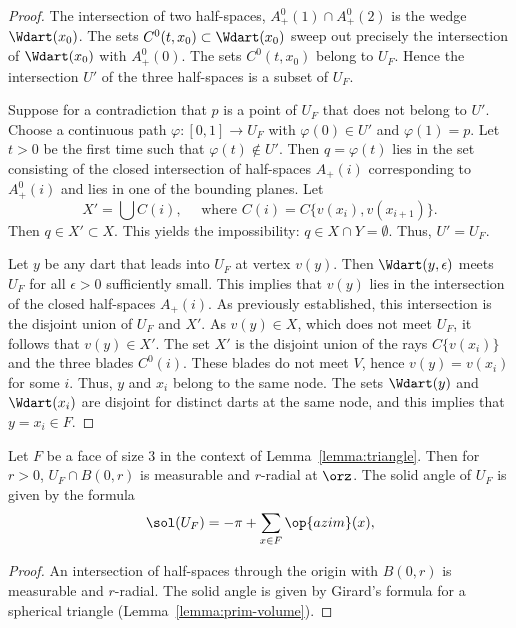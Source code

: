 \begin{proof} The intersection of two half-spaces, $A^0_+(1)\cap A^0_+(2)$ is
the wedge $\Wdart(x_0)$.   The sets $C^0(t,x_0)\subset\Wdart(x_0)$ sweep out precisely
the intersection of $\Wdart(x_0)$ with $A^0_+(0)$.  The sets $C^0(t,x_0)$ belong to
$U_F$.  Hence the intersection $U'$ of the three half-spaces is a subset of $U_F$.

Suppose for a contradiction 
that $p$ is a point of $U_F$ that does not belong to $U'$.  Choose a continuous path $\varphi:[0,1]\to U_F$ with $\varphi(0)\in U'$ and $\varphi(1)=p$.  Let $t>0$ be the first time such that $\varphi(t)\not\in U'$.  Then $q=\varphi(t)$ lies in the set consisting of the closed intersection of half-spaces $A_+(i)$ corresponding to $A^0_+(i)$ and lies
in one of the bounding planes.  Let 
$$
X' = \bigcup C(i),\quad\text{ where } C(i)=C\{v(x_i),v(x_{i+1})\}.
$$
Then $q\in X'\subset X$.  This yields the impossibility:
$q\in X\cap Y = \emptyset$.   Thus, $U'=U_F$.

Let $y$ be any dart that leads into $U_F$ at vertex $v(y)$.  Then
$\Wdart(y,\epsilon)$ meets $U_F$ for all $\epsilon>0$ sufficiently small.
This implies that $v(y)$ lies in the intersection of the closed half-spaces $A_+(i)$.  As previously established, this intersection is the disjoint union of $U_F$ and
$X'$.  As $v(y)\in X$, which does not meet $U_F$, it follows that $v(y)\in X'$.
The set $X'$ is the disjoint union of the rays $C\{v(x_i)\}$ and
the three blades $C^0(i)$.  These blades do not meet $V$, hence
$v(y)=v(x_i)$ for some $i$.  Thus, $y$ and $x_i$ belong to the same
node.  The sets $\Wdart(y)$ and $\Wdart( x_i)$ are disjoint for distinct darts at the same
node, and this implies that $y=x_i\in F$.
\end{proof}

\begin{corollary}\label{lemma:girard-component}
Let $F$ be a face of size $3$ in the context of Lemma~\ref{lemma:triangle}.  Then for $r>0$, $U_F \cap B(0,r)$ is measurable and $r$-radial at $\orz$.
The solid angle of $U_F$ is given by the formula
$$
\sol(U_F) = -\pi + \sum_{x\in F}\op{azim}(x),
$$
\end{corollary}
%
%
%

\begin{proof} An intersection of half-spaces through the origin 
with $B(0,r)$ is measurable and
$r$-radial.  The solid angle is given by Girard's formula for
a spherical triangle (Lemma~\ref{lemma:prim-volume}).
\end{proof}
%

